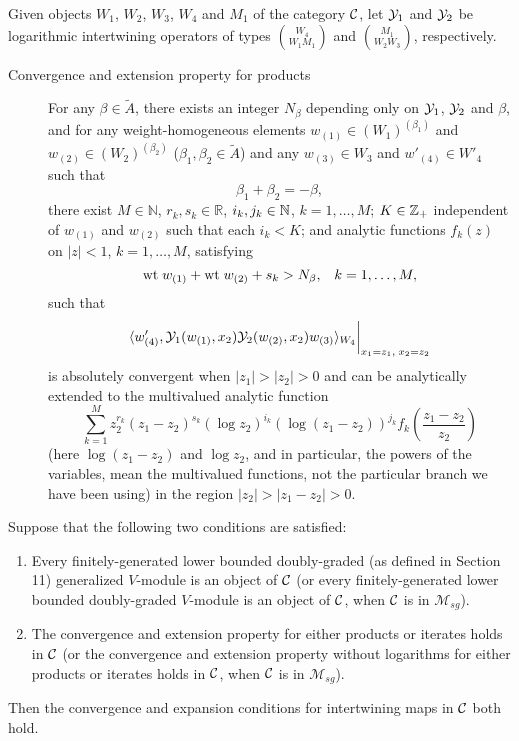 \documentclass[12pt]{article}
\begin{document}
Given objects $W_1$, $W_2$, $W_3$, $W_4$ and $M_1$ of the category
${\cal C}$, let ${\cal Y}_1$ and ${\cal Y}_2$ be logarithmic
intertwining operators of types ${W_4}\choose {W_1M_1}$ and
${M_1}\choose {W_2W_3}$, respectively.

\begin{description}

\item[Convergence and extension property for products] For any
$\beta\in \tilde{A}$, there exists an integer $N_{\beta}$ depending
only on ${\cal Y}_1$, ${\cal Y}_2$ and $\beta$, and for any
weight-homogeneous elements $w_{(1)}\in (W_1)^{(\beta_{1})}$ and
$w_{(2)}\in (W_2)^{(\beta_{2})}$ ($\beta_{1}, \beta_{2} \in
\tilde{A}$) and any $w_{(3)}\in W_3$ and $w'_{(4)}\in W'_4$ such that
\[
\beta_{1}+\beta_{2}=-\beta,
\]
there exist $M\in{\mathbb N}$, $r_{k}, s_{k}\in {\mathbb R}$, $i_{k},
j_{k}\in \mathbb{N}$, $k=1,\dots,M$; $K \in \mathbb{Z}_{+}$ independent of $w_{(1)}$ and
$w_{(2)}$ such that each $i_{k} < K$; and analytic functions $f_{k}(z)$ on
$|z|<1$, $k=1, \dots, M$, satisfying
\[
\mbox{\rm wt}\; w_{(1)}+\mbox{\rm wt}\; w_{(2)}+s_{k}>N_{\beta}, \;\;\;k=1, \dots, M,
\]
such that
\[
\langle w'_{(4)}, {\cal Y}_1(w_{(1)}, x_2) {\cal Y}_2(w_{(2)},
x_2)w_{(3)}\rangle_{W_4} \bigg\vert_{x_1= z_1, \;x_2=z_2}
\]
is absolutely convergent when $|z_1|>|z_2|>0$ and can be analytically
extended to the multivalued analytic function
\[
\sum_{k=1}^{M}z_2^{r_{k}}(z_1-z_2)^{s_{k}}(\log z_2)^{i_{k}}
(\log(z_1-z_2))^{j_{k}}f_{k}\left(\frac{z_1-z_2}{z_2}\right)
\]
(here $\log (z_{1}-z_{2})$ and $\log z_{2}$, and in particular, the
powers of the variables, mean the multivalued functions, not the
particular branch we have been using) in the region
$|z_2|>|z_1-z_2|>0$.

\end{description}

\setcounter{section}{11}
\setcounter{rema}{3}

\begin{theo}
Suppose that the following two conditions are satisfied:
\begin{enumerate}
\item Every finitely-generated lower bounded doubly-graded (as defined
in Section 11) generalized $V$-module is an object of ${\cal C}$ (or
every finitely-generated lower bounded doubly-graded $V$-module is an
object of ${\cal C}$, when ${\cal C}$ is in $\mathcal{M}_{sg}$).

\item The convergence and extension property for either products or
iterates holds in ${\cal C}$ (or the convergence and extension
property without logarithms for either products or iterates holds in
${\cal C}$, when ${\cal C}$ is in $\mathcal{M}_{sg}$).
\end{enumerate}
Then the convergence and expansion conditions for intertwining
maps in ${\cal C}$ both hold.
\end{theo}
\end{document}
